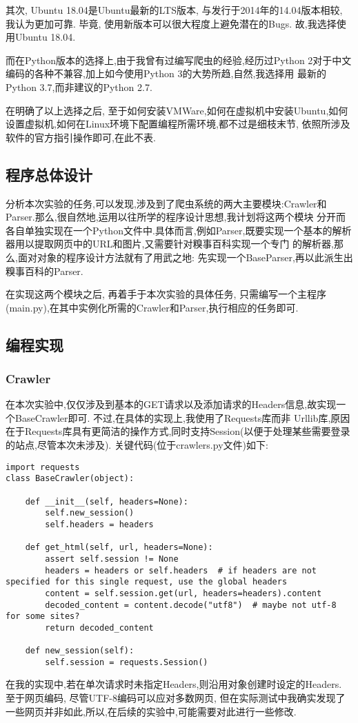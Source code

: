\documentclass[a4paper]{article}
\begin{document}
其次, Ubuntu 18.04是Ubuntu最新的LTS版本, 与发行于2014年的14.04版本相较, 我认为更加可靠. 毕竟, 使用新版本可以很大程度上避免潜在的Bugs.
故,我选择使用Ubuntu 18.04.

而在Python版本的选择上,由于我曾有过编写爬虫的经验,经历过Python 2对于中文编码的各种不兼容,加上如今使用Python 3的大势所趋,自然,我选择用
最新的Python 3.7,而非建议的Python 2.7.

在明确了以上选择之后, 至于如何安装VMWare,如何在虚拟机中安装Ubuntu,如何设置虚拟机,如何在Linux环境下配置编程所需环境,都不过是细枝末节,
依照所涉及软件的官方指引操作即可,在此不表.

        \subsection{程序总体设计}
分析本次实验的任务,可以发现,涉及到了爬虫系统的两大主要模块:Crawler和Parser.那么,很自然地,运用以往所学的程序设计思想,我计划将这两个模块
分开而各自单独实现在一个Python文件中.具体而言,例如Parser,既要实现一个基本的解析器用以提取网页中的URL和图片,又需要针对糗事百科实现一个专门
的解析器,那么,面对对象的程序设计方法就有了用武之地: 先实现一个BaseParser,再以此派生出糗事百科的Parser.

在实现这两个模块之后, 再着手于本次实验的具体任务, 只需编写一个主程序(main.py),在其中实例化所需的Crawler和Parser,执行相应的任务即可.    
        \subsection{编程实现}
            \subsubsection{Crawler}
在本次实验中,仅仅涉及到基本的GET请求以及添加请求的Headers信息,故实现一个BaseCrawler即可. 不过,在具体的实现上,我使用了Requests库而非
Urllib库,原因在于Requests库具有更简洁的操作方式,同时支持Session(以便于处理某些需要登录的站点,尽管本次未涉及). 
关键代码(位于crawlers.py文件)如下:
\begin{verbatim}
import requests
class BaseCrawler(object):

    def __init__(self, headers=None):
        self.new_session()
        self.headers = headers

    def get_html(self, url, headers=None):
        assert self.session != None
        headers = headers or self.headers  # if headers are not specified for this single request, use the global headers
        content = self.session.get(url, headers=headers).content
        decoded_content = content.decode("utf8")  # maybe not utf-8 for some sites?
        return decoded_content

    def new_session(self):
        self.session = requests.Session()
\end{verbatim}
在我的实现中,若在单次请求时未指定Headers,则沿用对象创建时设定的Headers. 至于网页编码, 尽管UTF-8编码可以应对多数网页,
但在实际测试中我确实发现了一些网页并非如此,所以,在后续的实验中,可能需要对此进行一些修改.
            
\end{document}
